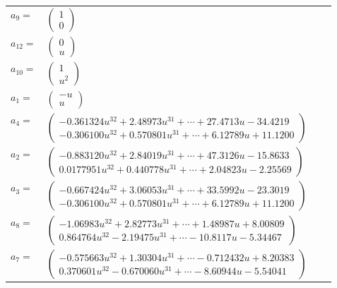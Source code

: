 \documentclass[1p]{elsarticle_modified}
\theoremstyle{definition}
\begin{document}
\begin{tabular}{m{7pt} m{180pt} m{7pt} m{180pt} }
\flushright $a_{9}=$&$\begin{pmatrix}1\\0\end{pmatrix}$ \\
\flushright $a_{12}=$&$\begin{pmatrix}0\\u\end{pmatrix}$ \\
\flushright $a_{10}=$&$\begin{pmatrix}1\\u^2\end{pmatrix}$ \\
\flushright $a_{1}=$&$\begin{pmatrix}- u\\u\end{pmatrix}$ \\
\flushright $a_{4}=$&$\begin{pmatrix}-0.361324 u^{32}+2.48973 u^{31}+\cdots+27.4713 u-34.4219\\-0.306100 u^{32}+0.570801 u^{31}+\cdots+6.12789 u+11.1200\end{pmatrix}$ \\
\flushright $a_{2}=$&$\begin{pmatrix}-0.883120 u^{32}+2.84019 u^{31}+\cdots+47.3126 u-15.8633\\0.0177951 u^{32}+0.440778 u^{31}+\cdots+2.04823 u-2.25569\end{pmatrix}$ \\
\flushright $a_{3}=$&$\begin{pmatrix}-0.667424 u^{32}+3.06053 u^{31}+\cdots+33.5992 u-23.3019\\-0.306100 u^{32}+0.570801 u^{31}+\cdots+6.12789 u+11.1200\end{pmatrix}$ \\
\flushright $a_{8}=$&$\begin{pmatrix}-1.06983 u^{32}+2.82773 u^{31}+\cdots+1.48987 u+8.00809\\0.864764 u^{32}-2.19475 u^{31}+\cdots-10.8117 u-5.34467\end{pmatrix}$ \\
\flushright $a_{7}=$&$\begin{pmatrix}-0.575663 u^{32}+1.30304 u^{31}+\cdots-0.712432 u+8.20383\\0.370601 u^{32}-0.670060 u^{31}+\cdots-8.60944 u-5.54041\end{pmatrix}$ \\

\end{tabular}
\end{document}
